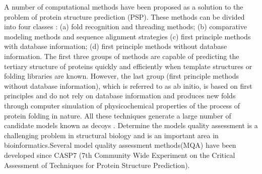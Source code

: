 A number of computational methods have been proposed as a solution to the problem of protein structure prediction (PSP)\cite{9}\cite{10}\cite{11}\cite{12}. These methods can be divided into four classes \cite{13}: (a) fold recognition and threading methods\cite{14}\cite{15}\cite{16}\cite{17}; (b) comparative modeling methods and sequence alignment strategies \cite{18}\cite{19} (c) first principle methods with database information\cite{20}\cite{21}; (d) first principle methods without database information\cite{10}. The first three groups of methods are capable of predicting the tertiary structure of proteins quickly and efficiently when template structures or folding libraries are known\cite{22}. However, the last group (first principle methods without database information), which is referred to as ab initio, is based on first principles and do not rely on database information and produces new folds through computer simulation of physicochemical properties of the process of protein folding in nature. All these techniques generate a large number of candidate models known as decoys \cite{23}. Determine the models quality assessment is a challenging problem in structural biology and is an important area in bioinformatics\cite{24}.Several model quality assessment methods(MQA) have been developed since CASP7 (7th Community Wide Experiment on the Critical Assessment of Techniques for Protein Structure Prediction)\cite{24}\cite{25}.

